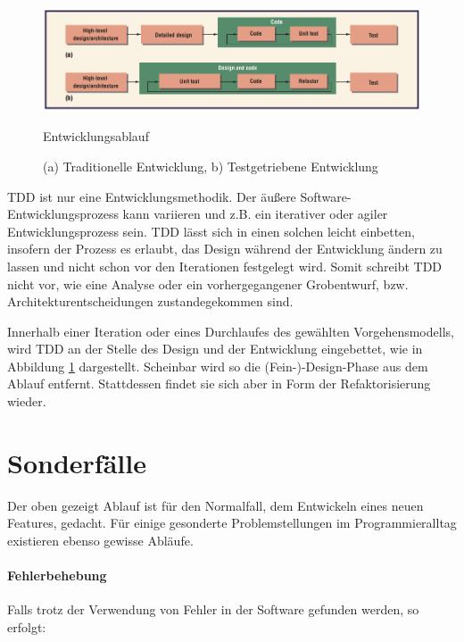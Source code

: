     \begin{figure}[hbtp]
 \centering
 \includegraphics[width=\textwidth]{./diagrams/ablauf.png}
 \caption{Entwicklungsablauf}
 \caption*{(a) Traditionelle Entwicklung,  b) Testgetriebene Entwicklung}
 \label{fig:devflow}
\end{figure}

 TDD ist nur eine Entwicklungsmethodik. Der äußere Software-Entwicklungsprozess kann variieren und z.B. ein iterativer oder agiler Entwicklungsprozess sein. TDD lässt sich in einen solchen leicht einbetten, insofern der Prozess es erlaubt, das Design während der Entwicklung ändern zu lassen und nicht schon vor den Iterationen festgelegt wird. Somit schreibt TDD nicht vor, wie eine Analyse oder ein vorhergegangener Grobentwurf, bzw. Architekturentscheidungen zustandegekommen sind.

 Innerhalb einer Iteration oder eines Durchlaufes des gewählten Vorgehensmodells, wird TDD an der Stelle des Design und der Entwicklung eingebettet, wie in Abbildung \ref{fig:devflow} dargestellt. Scheinbar wird so die (Fein-)-Design-Phase aus dem Ablauf entfernt. Stattdessen findet sie sich aber in Form der Refaktorisierung wieder.


  \section{Sonderfälle}
  \label{sec:tddspecialcircumstances}

  Der oben gezeigt Ablauf ist für den Normalfall, dem Entwickeln eines neuen Features, gedacht. Für einige gesonderte Problemstellungen im Programmieralltag existieren ebenso gewisse Abläufe.

  \paragraph{Fehlerbehebung} Falls trotz der Verwendung von  Fehler in der Software gefunden werden, so erfolgt:

